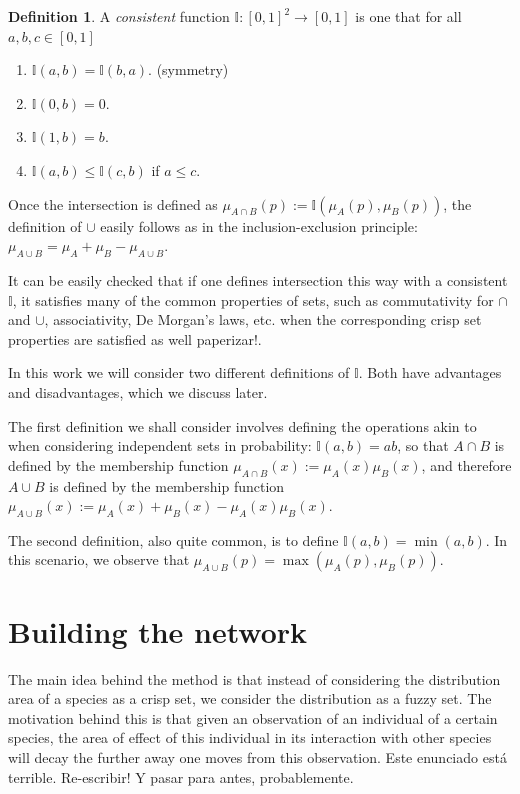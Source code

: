 \documentclass[12pt]{article}
\numberwithin{equation}{section} %
\numberwithin{figure}{section} %
\def\II{{\mathbb{I}}}
\theoremstyle{definition}
\newtheorem{definition}[theorem]{Definition}
\def\tcr#1{\textcolor{MyRed}{#1}}
\begin{document}
\begin{definition}
A \emph{consistent} function $\II : [0,1]^2 \to [0,1]$ is one that for all $a,b,c\in[0,1]$
\begin{enumerate}
  \item $\II(a,b) = \II(b,a)$. (symmetry)
  \item $\II(0,b) = 0$.
  \item $\II(1,b) = b$.
  \item $\II(a,b) \leq \II(c,b)$ if $a \leq c$.
\end{enumerate}
\end{definition}

Once the intersection is defined as $\mu_{A\cap B}(p) := \II(\mu_A(p),\mu_B(p))$, the definition of $\cup$ easily follows as in the inclusion-exclusion principle: $\mu_{A\cup B} = \mu_A + \mu_B - \mu_{A\cup B}$.

It can be easily checked that if one defines intersection this way with a consistent $\II$, it satisfies many of the common properties of sets, such as commutativity for $\cap$ and $\cup$, associativity, De Morgan's laws, etc. when the corresponding crisp set properties are satisfied as well \tcr{paperizar!}.



In this work we will consider two different definitions of $\II$. Both have advantages and disadvantages, which we discuss later.

The first definition we shall consider involves defining the operations akin to when considering independent sets in probability: $\II(a,b) = ab$, so that $A\cap B$ is defined by the membership function $\mu_{A\cap B} (x) := \mu_A(x)\mu_B(x)$, and therefore $A\cup B$ is defined by the membership function $\mu_{A\cup B} (x) := \mu_A(x)+\mu_B(x)-\mu_A(x)\mu_B(x)$.

The second definition, also quite common, is to define $\II(a,b) = \min(a,b)$. In this scenario, we observe that $\mu_{A\cup B}(p) = \max(\mu_A(p),\mu_B(p))$.

\section{Building the network}

The main idea behind the method is that instead of considering the distribution area of a species as a crisp set, we consider the distribution as a fuzzy set. The motivation behind this is that given an observation of an individual of a certain species, the area of effect of this individual in its interaction with other species will decay the further away one moves from this observation. \tcr{Este enunciado está terrible. Re-escribir! Y pasar para antes, probablemente.}
\end{document}
